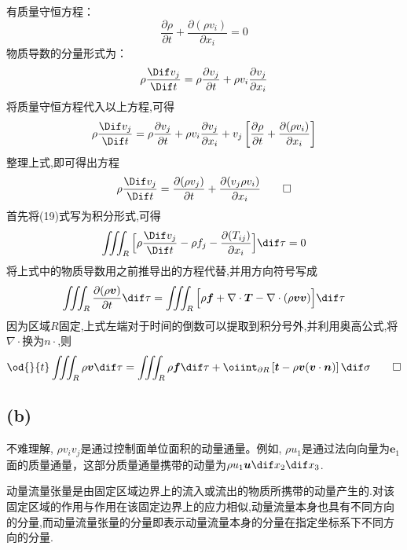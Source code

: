 \documentclass[12pt]{article}
\begin{document}
有质量守恒方程：
\begin{equation}
	\frac{\partial \rho}{\partial t} + \frac{\partial(\rho v_i)}{\partial x_i}=0
\end{equation}
物质导数的分量形式为：
\begin{equation}
	\rho\frac{\Dif  v_j}{\Dif t}=\rho\frac{\partial v_j}{\partial t} + \rho v_i\frac{\partial v_j}{\partial x_i}
\end{equation}
将质量守恒方程代入以上方程,可得
\begin{equation}
	\rho\frac{\Dif  v_j}{\Dif t}=\rho\frac{\partial v_j}{\partial t} + \rho v_i\frac{\partial v_j}{\partial x_i} + v_j \left[\frac{\partial \rho}{\partial t} + \frac{\partial(\rho v_i)}{\partial x_i}\right]
\end{equation}
整理上式,即可得出方程
\begin{equation}
	\rho\frac{\Dif  v_j}{\Dif t}=\frac{\partial(\rho v_j)}{\partial t}+\frac{\partial (v_j\rho v_i)}{\partial x_i}\qed
\end{equation}
首先将(19)式写为积分形式,可得
\begin{equation}
	\iiint_{R}\Big[\rho\frac{\Dif  v_j}{\Dif t} - \rho f_j - \frac{\partial(T_{ij})}{\partial x_i}\Big] \dif \tau = 0
\end{equation}
将上式中的物质导数用之前推导出的方程代替,并用方向符号写成
\begin{equation}
\iiint_{R} \frac{\partial (\rho \bm{v})}{\partial t} \dif \tau = \iiint_{R} \Big[\rho \bm{f} + \nabla\cdot \bm{T} - \nabla\cdot(\rho \bm{v}\bm{v})\Big]\dif \tau
\end{equation}
因为区域$R$固定,上式左端对于时间的倒数可以提取到积分号外,并利用奥高公式,将$ \nabla\cdot$换为$ n\cdot$,则
\begin{equation}
	\od{}{t}\iiint_{R} \rho \bm{v} \dif \tau = \iiint_{R} \rho \bm{f} \dif \tau + \oiint_{\partial R} \left[ \bm{t} - \rho \bm{v}(\bm{v}\cdot \bm{n}) \right] \dif \sigma  \qed
\end{equation}

\subsection{(b)}

不难理解, $\rho v_iv_j$是通过控制面单位面积的动量通量。例如, $\rho u_1$是通过法向向量为$\bm{e}_1$面的质量通量，这部分质量通量携带的动量为$\rho u_1 \bm{u} \dif x_2 \dif x_3$.

动量流量张量是由固定区域边界上的流入或流出的物质所携带的动量产生的.对该固定区域的作用与作用在该固定边界上的应力相似,动量流量本身也具有不同方向的分量,而动量流量张量的分量即表示动量流量本身的分量在指定坐标系下不同方向的分量.
\end{document}
